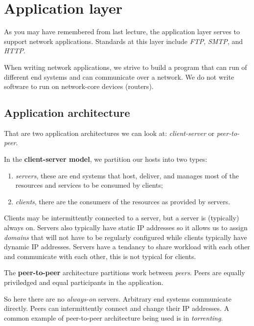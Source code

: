 \chapter{Application layer}

As you may have remembered from last lecture, the application layer serves to support network applications. Standards at this layer include \emph{FTP}, \emph{SMTP}, and \emph{HTTP}.

When writing network applications, we strive to build a program that can run of different end systems and can communicate over a network. We do not write software to run on network-core devices (routers).

\section{Application architecture}

That are two application architectures we can look at: \emph{client-server} or \emph{peer-to-peer}.

\begin{definition}
    In the \textbf{client-server model}, we partition our hosts into two types:
    \begin{enumerate}
        \item \emph{servers}, these are end systems that host, deliver, and manages most of the resources and services to be consumed by clients;
        \item \emph{clients}, there are the consumers of the resources as provided by servers.
    \end{enumerate}
\end{definition}

Clients may be intermittently connected to a server, but a server is (typically) always on. Servers also typically have static IP addresses so it allows us to assign \emph{domains} that will not have to be regularly configured while clients typically have dynamic IP addresses. Servers have a tendancy to share workload with each other and communicate with each other, this is not typical for clients. 

\begin{definition}
    The \textbf{peer-to-peer} architecture partitions work between \emph{peers}. Peers are equally priviledged and equal participants in the application. 
\end{definition}

So here there are no \emph{always-on} servers. Arbitrary end systems communicate directly. Peers can intermittently connect and change their IP addresses. A common example of peer-to-peer architecture being used is in \emph{torrenting}.

